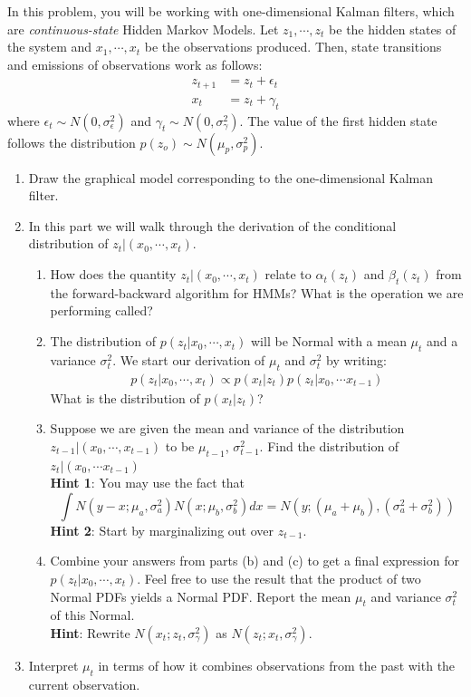 \documentclass[submit]{harvardml}
\newcommand{\sigeps}{\sigma_{\epsilon}}
\newcommand{\siggam}{\sigma_{\gamma}}
\newcommand{\muzp}{\mu_{p}}
\newcommand{\sigzp}{\sigma_{p}}
\begin{document}
\begin{problem}
In this problem, you will be working with one-dimensional Kalman filters, which are \textit{continuous-state} Hidden Markov Models. Let $z_1, \cdots , z_t$ be the hidden states of the system and $x_1, \cdots, x_t$ be the observations produced. Then, state transitions and emissions of observations work as follows:
  \begin{eqnarray*}
    z_{t+1} &= z_{t} + \epsilon_{t} \\
    x_{t} & = z_{t} + \gamma_{t}
  \end{eqnarray*}
 where $\epsilon_t \sim N(0,\sigeps^2)$ and $\gamma_t \sim N(0,\siggam^2)$. The value of the first hidden state follows the distribution $p(z_o) \sim N(\muzp,\sigzp^2)$.

\begin{enumerate}
  \item Draw the graphical model corresponding to the one-dimensional Kalman filter.
  \item In this part we will walk through the derivation of the conditional distribution of $z_t|(x_0, \cdots, x_{t})$.
  \begin{enumerate}
      \item How does the quantity $z_t|(x_0, \cdots, x_{t})$ relate to $\alpha_t(z_t)$ and $\beta_t(z_t)$ from the forward-backward algorithm for HMMs?  What is the operation we are performing called?
      \item The distribution of $p(z_t|x_0, \cdots, x_t)$ will be Normal with a mean $\mu_t$ and a variance $\sigma_t^2$. We start our derivation of $\mu_t$ and $\sigma_t^2$ by writing:
      \begin{align*}
          p(z_t|x_0, \cdots, x_t) \propto p(x_t|z_t)p(z_t|x_0, \cdots x_{t-1})
      \end{align*}
      What is the distribution of $p(x_t|z_t)$?
      \item Suppose we are given the mean and variance of the distribution $z_{t-1}|(x_0, \cdots, x_{t-1})$ to be $\mu_{t-1}$, $\sigma^2_{t-1}$. Find the distribution of $z_t|(x_0, \cdots x_{t-1})$\\
      \textbf{Hint 1}: You may use the fact that 
      \[\int N(y-x ; \mu_a, \sigma^2_a)N(x ; \mu_b, \sigma^2_b)dx = N(y ; (\mu_a + \mu_b), (\sigma^2_a + \sigma^2_b))\]
      \textbf{Hint 2}: Start by marginalizing out over $z_{t-1}$.
      \item Combine your answers from parts (b) and (c) to get a final expression for $p(z_t|x_0, \cdots, x_t)$. Feel free to use the result that the product of two Normal PDFs yields a Normal PDF. Report the mean $\mu_t$ and variance $\sigma_t^2$ of this Normal.\\
      \textbf{Hint}: Rewrite $N(x_t; z_t, \siggam^2)$ as $N(z_t; x_t, \siggam^2)$.
  \end{enumerate}
  \item Interpret $\mu_t$ in terms of how it combines observations from the past with the current observation. 
\end{enumerate}
\end{problem}
\end{document}

